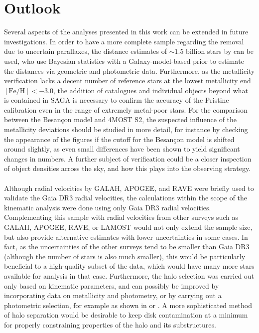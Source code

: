 \documentclass[a4paper,11pt]{article}
\begin{document}
\section{Outlook} \label{outlook}
Several aspects of the analyses presented in this work can be extended in future investigations. In order to have a more complete sample regarding the removal due to uncertain parallaxes, the distance estimates of ${\sim}1.5$ billion stars by \citet{bj21} can be used, who use Bayesian statistics with a Galaxy-model-based prior to estimate the distances via geometric and photometric data. Furthermore, as the metallicity verification lacks a decent number of reference stars at the lowest metallicity end $\mathrm{[Fe/H]}<-3.0$, the addition of catalogues and individual objects beyond what is contained in SAGA is necessary to confirm the accuracy of the Pristine calibration even in the range of extremely metal-poor stars. For the comparison between the Besan\c{c}on model and 4MOST S2, the suspected influence of the metallicity deviations should be studied in more detail, for instance by checking the appearance of the figures if the cutoff for the Besan\c{c}on model is shifted around slightly, as even small differences have been shown to yield significant changes in numbers. A further subject of verification could be a closer inspection of object densities across the sky, and how this plays into the observing strategy.\\ \\
%
Although radial velocities by GALAH, APOGEE, and RAVE were briefly used to validate the Gaia DR3 radial velocities, the calculations within the scope of the kinematic analysis were done using only Gaia DR3 radial velocities. Complementing this sample with radial velocities from other surveys such as GALAH, APOGEE, RAVE, or LAMOST would not only extend the sample size, but also provide alternative estimates with lower uncertainties in some cases. In fact, as the uncertainties of the other surveys tend to be smaller than Gaia DR3 (although the number of stars is also much smaller), this would be particularly beneficial to a high-quality subset of the data, which would have many more stars available for analysis in that case. Furthermore, the halo selection was carried out only based on kinematic parameters, and can possibly be improved by incorporating data on metallicity and photometry, or by carrying out a photometric selection, for example as shown in \citet{an13} or \citet{youakim20}. A more sophisticated method of halo separation would be desirable to keep disk contamination at a minimum for properly constraining properties of the halo and its substructures.\\ \\
\end{document}

